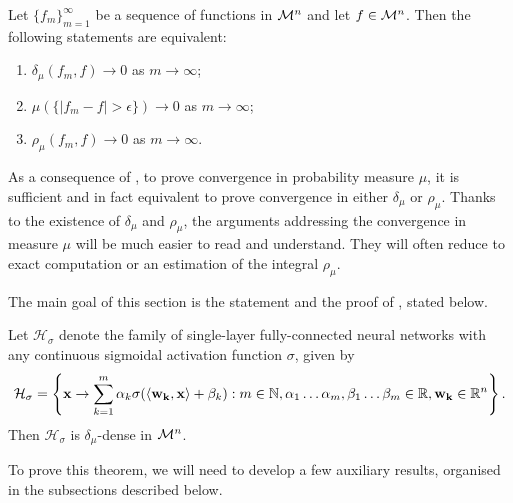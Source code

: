 \begin{proposition*}
Let $\{ f_m \}_{m=1}^\infty$ be a sequence of functions in ${\mathcal M}^n$ and let $f \in {\mathcal M}^n$. Then the following statements are equivalent:
\begin{enumerate}[label=(\alph*),noitemsep]
\item $\delta_\mu (f_m, f) \to 0$ as $m \to \infty$;
\item $\mu (\{ | f_m - f | > \epsilon \}) \to 0$ as $m \to \infty$;
\item $\rho_\mu (f_m, f) \to 0$ as $m \to \infty$.
\end{enumerate}
\end{proposition*}
\begin{remark}
As a consequence of , to prove convergence in probability measure $\mu$, it is sufficient and in fact equivalent to prove convergence in either $\delta_\mu$ or $\rho_\mu$. Thanks to the existence of $\delta_\mu$ and $\rho_\mu$, the arguments addressing the convergence in measure $\mu$ will be much easier to read and understand. They will often reduce to exact computation or an estimation of the integral $\rho_\mu$. 
\end{remark}
The main goal of this section is the statement and the proof of , stated below.
\begin{theorem*}
Let $\mathcal{H}_{\sigma}$ denote the family of single-layer fully-connected neural networks with any continuous sigmoidal activation function $\sigma$, given by \begin{align*}
\mathcal{H}_{\sigma} = \left \{ \mathbf{x} \to \sum_{k=1}^{m} \alpha_k \sigma{\left (\langle \mathbf{w_k}, \mathbf{x} \rangle + \beta_k \right)} : m \in {\mathbb N}, \alpha_1 \ldots \alpha_m, \beta_1 \ldots \beta_m \in {\mathbb R}, \mathbf{w_k} \in {\mathbb R}^n \right \}.
\end{align*}
Then $\mathcal{H}_{\sigma}$ is $\delta_\mu$-dense in ${\mathcal M}^n$.
\end{theorem*}
To prove this theorem, we will need to develop a few auxiliary results, organised in the subsections described below.
